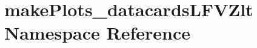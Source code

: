 \hypertarget{namespacemakePlots__datacardsLFVZlt}{
\section{makePlots\_\-datacardsLFVZlt Namespace Reference}
\label{namespacemakePlots__datacardsLFVZlt}
}

